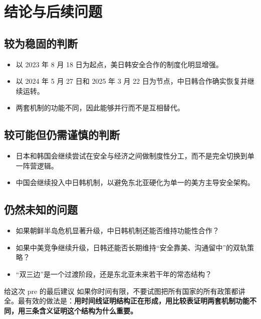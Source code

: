 \documentclass[a4paper]{article}
\begin{document}
\section{结论与后续问题}

\subsection{较为稳固的判断}

\begin{itemize}
\item 以 2023 年 8 月 18 日为起点，美日韩安全合作的制度化明显增强。
\item 以 2024 年 5 月 27 日和 2025 年 3 月 22 日为节点，中日韩合作确实恢复并继续运转。
\item 两套机制的功能不同，因此能够并行而不是互相替代。
\end{itemize}

\subsection{较可能但仍需谨慎的判断}

\begin{itemize}
\item 日本和韩国会继续尝试在安全与经济之间做制度性分工，而不是完全切换到单一阵营逻辑。
\item 中国会继续投入中日韩机制，以避免东北亚硬化为单一的美方主导安全架构。
\end{itemize}

\subsection{仍然未知的问题}

\begin{itemize}
\item 如果朝鲜半岛危机显著升级，中日韩机制还能否维持功能性合作？
\item 如果中美竞争继续升级，日韩还能否长期维持“安全靠美、沟通留中”的双轨策略？
\item “双三边”是一个过渡阶段，还是东北亚未来若干年的常态结构？
\end{itemize}

\begin{riskbox}{给这次 pre 的最后建议}
如果你时间有限，不要试图把所有国家的所有政策都讲全。最有效的做法是：\textbf{用时间线证明结构正在形成，用比较表证明两套机制功能不同，用三条含义证明这个结构为什么重要。}
\end{riskbox}
\end{document}
